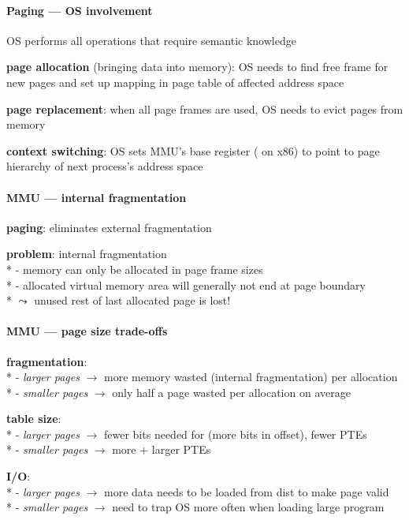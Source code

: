 \paragraph{Paging --- OS involvement}
\begin{items}
  \item OS performs all operations that require semantic knowledge
  \item \textbf{page allocation} (bringing data into memory): OS needs to find free frame for new pages and set up mapping in page table of affected address space
  \item \textbf{page replacement}: when all page frames are used, OS needs to evict pages from memory
  \item \textbf{context switching}: OS sets MMU's base register ( on x86) to point to page hierarchy of next process's address space
\end{items}

\paragraph{MMU --- internal fragmentation}
\begin{items}
  \item \textbf{paging}: eliminates external fragmentation
  \item \textbf{problem}: internal fragmentation \\*
    - memory can only be allocated in page frame sizes \\*
    - allocated virtual memory area will generally not end at page boundary \\*
    \( \leadsto \) unused rest of last allocated page is lost!
\end{items}

\paragraph{MMU --- page size trade-offs}
\begin{items}
  \item \textbf{fragmentation}: \\*
    - \emph{larger pages} \( \to \) more memory wasted (internal fragmentation) per allocation \\*
    - \emph{smaller pages} \( \to \) only half a page wasted per allocation on average
  \item \textbf{table size}: \\*
    - \emph{larger pages} \( \to \) fewer bits needed for  (more bits in offset), fewer PTEs \\*
    - \emph{smaller pages} $ \to $ more + larger PTEs
  \item \textbf{I/O}: \\*
    - \emph{larger pages} $ \to $ more data needs to be loaded from dist to make page valid \\*
    - \emph{smaller pages} $ \to $ need to trap OS more often when loading large program
\end{items}

